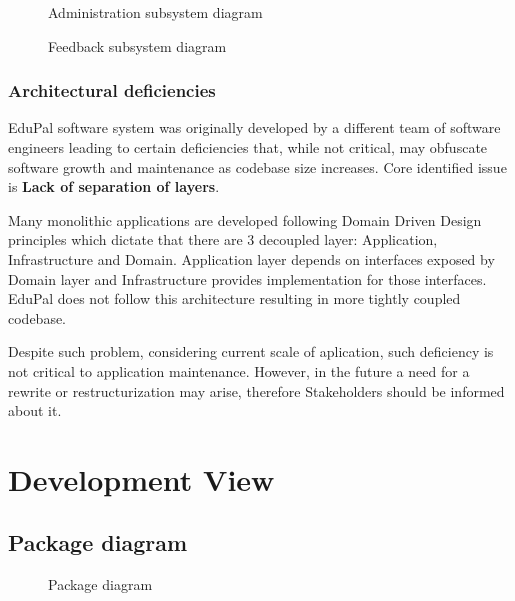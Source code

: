 \documentclass[
    english, %
]{VUMIFPSkursinis}
\begin{document}
\begin{figure}[ht]
    \centering
    
    \caption{Administration subsystem diagram}
    \label{administration-model}
\end{figure}

\begin{figure}[ht]
    \centering
    
    \caption{Feedback subsystem diagram}
    \label{feedback-model}
\end{figure}

\subsubsection{Architectural deficiencies}

EduPal software system was originally developed by a different team of software engineers leading to certain deficiencies that, while not critical, may obfuscate software growth and maintenance as codebase size increases. Core identified issue is \textbf{Lack of separation of layers}.

Many monolithic applications are developed following Domain Driven Design principles which dictate that there are 3 decoupled layer: Application, Infrastructure and Domain. Application layer depends on interfaces exposed by Domain layer and Infrastructure provides implementation for those interfaces. EduPal does not follow this architecture resulting in more tightly coupled codebase.

Despite such problem, considering current scale of aplication, such deficiency is not critical to application maintenance. However, in the future a need for a rewrite or restructurization may arise, therefore Stakeholders should be informed about it.

\section{Development View}

\subsection{Package diagram}

\begin{figure}[ht]
    \centering
    
    \label{package-diagram}
    \caption{Package diagram}
\end{figure}
\end{document}

